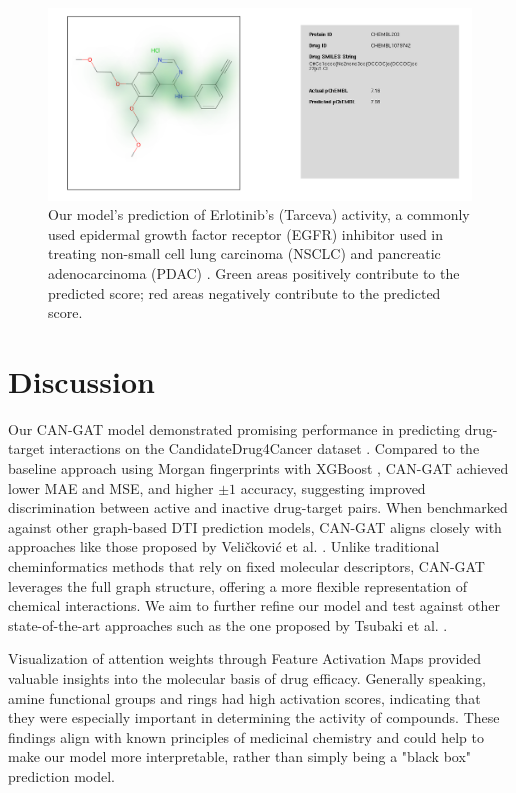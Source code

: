 \documentclass[fontsize=11pt]{article}
\begin{document}
\begin{figure}
    \centering
    \includegraphics[width=1\linewidth]{assets/Erlotinib.png}
    \caption{Our model's prediction of Erlotinib's (Tarceva) activity, a commonly used epidermal growth factor receptor (EGFR) inhibitor used in treating non-small cell lung carcinoma (NSCLC) and pancreatic adenocarcinoma (PDAC) \cite{Rosell2012}. Green areas positively contribute to the predicted score; red areas negatively contribute to the predicted score.}
    \label{fig:enter-label}
\end{figure}

\section*{Discussion}
Our CAN-GAT model demonstrated promising performance in predicting drug-target interactions on the CandidateDrug4Cancer dataset \cite{Ye2022}. Compared to the baseline approach using Morgan fingerprints with XGBoost \cite{Rogers2010,ChenGuestrin2016}, CAN-GAT achieved lower MAE and MSE, and higher $\pm1$ accuracy, suggesting improved discrimination between active and inactive drug-target pairs. When benchmarked against other graph-based DTI prediction models, CAN-GAT aligns closely with approaches like those proposed by Veličković et al. \cite{Velickovic2018}. Unlike traditional cheminformatics methods that rely on fixed molecular descriptors, CAN-GAT leverages the full graph structure, offering a more flexible representation of chemical interactions. We aim to further refine our model and test against other state-of-the-art approaches such as the one proposed by Tsubaki et al. \cite{Tsubaki2019}.

Visualization of attention weights through Feature Activation Maps \cite{Pope2019} provided valuable insights into the molecular basis of drug efficacy. Generally speaking, amine functional groups and rings had high activation scores, indicating that they were especially important in determining the activity of compounds. These findings align with known principles of medicinal chemistry \cite{Chen2016} and could help to make our model more interpretable, rather than simply being a "black box" prediction model.
\end{document}
